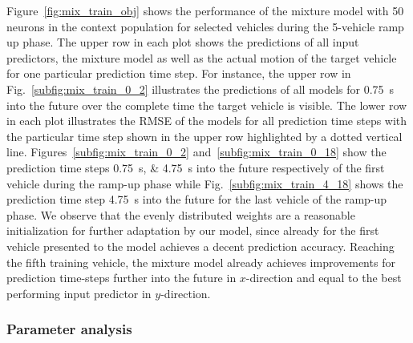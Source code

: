 Figure~\ref{fig:mix_train_obj} shows the performance of the mixture model with \num{50} neurons in the context population for selected vehicles during the \num{5}-vehicle ramp up phase.
The upper row in each plot shows the predictions of all input predictors, the mixture model as well as the actual motion of the target vehicle for one particular prediction time step.
For instance, the upper row in Fig.~\ref{subfig:mix_train_0_2} illustrates the predictions of all models for \SI{0.75}{\second} into the future over the complete time the target vehicle is visible.
The lower row in each plot illustrates the \ac{RMSE} of the models for all prediction time steps with the particular time step shown in the upper row highlighted by a dotted vertical line.
Figures~\ref{subfig:mix_train_0_2} and~\ref{subfig:mix_train_0_18} show the prediction time steps \SIlist{0.75;4.75}{\second} into the future respectively of the first vehicle during the ramp-up phase while Fig.~\ref{subfig:mix_train_4_18} shows the prediction time step \SI{4.75}{\second} into the future for the last vehicle of the ramp-up phase.
We observe that the evenly distributed weights are a reasonable initialization for further adaptation by our model, since already for the first vehicle presented to the model achieves a decent prediction accuracy.
Reaching the fifth training vehicle, the mixture model already achieves improvements for prediction time-steps further into the future in $x$-direction and equal to the best performing input predictor in $y$-direction.

\subsubsection{Parameter analysis}%
\label{ssubsec:parameter_analysis}

